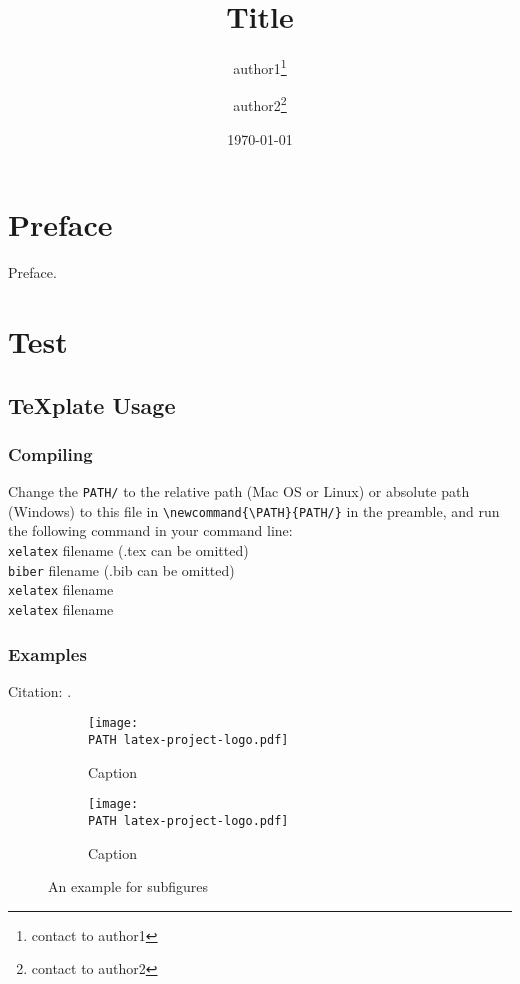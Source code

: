 \documentclass[openany]{book}
\title{Title}
\author{ author1\thanks{contact to author1}
	\and
		author2\thanks{contact to author2}}
\date{\today} %
\newcommand{\PATH}{./}
\theoremstyle{plain}
\theoremstyle{definition}
\begin{document}
\maketitle %
\frontmatter
\chapter{Preface}
Preface.

\tableofcontents

\mainmatter
\chapter{Test}
\section{\texorpdfstring{\TeX{}plate Usage}{TeXplate Usage}}
\subsection{Compiling}

Change the \verb|PATH/| to the relative path (Mac OS or Linux) or absolute path (Windows) to this file in \verb|\newcommand{\PATH}{PATH/}| in the preamble, and run the following command in your command line:\\[0pt]
\verb|xelatex| filename (.tex can be omitted)\\
\verb|biber| filename (.bib can be omitted)\\
\verb|xelatex| filename\\
\verb|xelatex| filename

\subsection{Examples}

Citation: \cite{Knuth}.

\begin{figure}[h] %
\centering
\begin{subfigure}{.5\textwidth}
	\centering
	\texttt{[image: \\PATH latex-project-logo.pdf]}
	\caption{Caption}
	\label{subfigure1}
\end{subfigure}%
\begin{subfigure}{.5\textwidth}
	\centering
	\texttt{[image: \\PATH latex-project-logo.pdf]}
	\caption{Caption}
	\label{subfigure2}
\end{subfigure}
\caption{An example for subfigures}
\end{figure}
\end{document}
